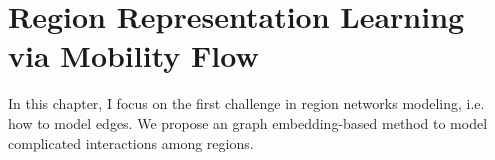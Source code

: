 \chapter{Region Representation Learning via Mobility Flow}
\label{ch:embedding}

In this chapter, I focus on the first challenge in region networks modeling, i.e. how to model edges. We propose an graph embedding-based method to model complicated interactions among regions. 








